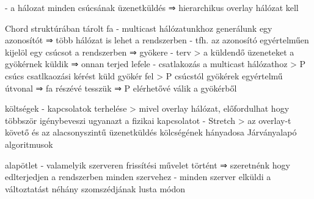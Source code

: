 \documentclass[twoside, a4paper, 12pt]{article}
\begin{document}
\begin{description}
                                                                        - a hálozat minden csúcsának üzenetküldés
                                                                        ⇒ hierarchikus overlay hálózat kell
                                                                    \item Chord struktúrában tárolt fa
                                                                        - multicast hálózatunkhoz generálunk egy azonosítót ⇒ több hálózat is lehet a rendszerben
                                                                        - tfh. az azonosító egyértelműen kijelöl egy csúcsot a rendszerben ⇒ gyökere
                                                                        - terv
                                                                        > a küldendő üzeneteket a gyökérnek küldik ⇒ onnan terjed lefele
                                                                        - csatlakozás a multicast hálózathoz
                                                                        > P csúcs csatlkaozási kérést küld gyökér fel
                                                                        > P csúcstól gyökérek egyértelmű útvonal ⇒ fa részévé tesszük
                                                                        ⇒ P elérhetővé válik a gyökérből
                                                                    \item költségek
                                                                        - kapcsolatok terhelése
                                                                        > mivel overlay hálózat, előfordulhat hogy többször igénybeveszi ugyanazt a fizikai kapcsolatot
                                                                        - Stretch 
                                                                        > az overlay-t követő és az alacsonyszintű üzenetküldés kölcségének hányadosa
                                                                        Járványalapó algoritmusok
                                                                    \item alapötlet
                                                                        - valamelyik szerveren frissítési művelet történt 
                                                                        ⇒ szeretnénk hogy edlterjedjen a rendszerben minden szervehez
                                                                        - minden szerver elküldi a változtatást néhány szomszédjának lusta módon

\end{description}
\end{document}
